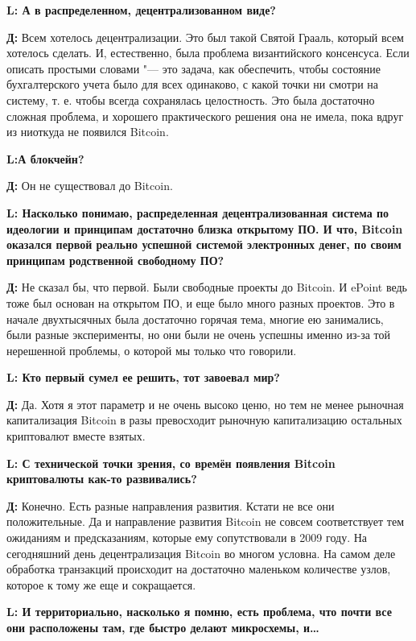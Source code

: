 \documentclass[10pt, a5paper]{article}
\begin{document}
{\noindent \bf L: А в распределенном, децентрализованном виде?}

{\noindent \bf Д:} Всем хотелось децентрализации. Это был такой Святой Грааль, который всем хотелось сделать. И, естественно, была проблема византийского консенсуса. Если описать простыми словами "--- это задача, как обеспечить, чтобы состояние бухгалтерского учета было для всех одинаково, с какой точки ни смотри на систему, т. е. чтобы всегда сохранялась целостность. Это была достаточно сложная проблема, и хорошего практического решения она не имела, пока вдруг из ниоткуда не появился Bitcoin.

{\noindent \bf L:А блокчейн?}

{\noindent \bf Д:} Он не существовал до Bitcoin. 

{\noindent \bf L: Насколько понимаю, распределенная децентрализованная система по идеологии и принципам достаточно близка открытому ПО. И что, Bitcoin оказался первой реально успешной системой электронных денег, по своим принципам родственной свободному ПО?}

{\noindent \bf Д:} Не сказал бы, что первой. Были свободные проекты до Bitcoin. И ePoint ведь тоже был основан на открытом ПО, и еще было много разных проектов. Это в начале двухтысячных была достаточно горячая тема, многие ею занимались, были разные эксперименты, но они были не очень успешны именно из-за той нерешенной проблемы, о которой мы только что говорили.

{\noindent \bf L: Кто первый сумел ее решить, тот завоевал мир?}

{\noindent \bf Д:} Да. Хотя я этот параметр и не очень высоко ценю, но тем не менее рыночная капитализация Bitcoin в разы превосходит рыночную капитализацию остальных криптовалют вместе взятых.

{\noindent \bf L: С технической точки зрения, со времён появления Bitcoin криптовалюты как-то развивались?}

{\noindent \bf Д:} Конечно. Есть разные направления развития. Кстати не все они положительные. Да и направление развития Bitcoin не совсем соответствует тем ожиданиям и предсказаниям, которые ему сопутствовали в 2009 году.  На сегодняшний день децентрализация Bitcoin во многом условна. На самом деле обработка транзакций происходит на достаточно маленьком количестве узлов, которое к тому же еще и сокращается.

{\noindent \bf L: И территориально, насколько я помню, есть проблема, что почти все они расположены там, где быстро делают микросхемы, и\ldots}
\end{document}
